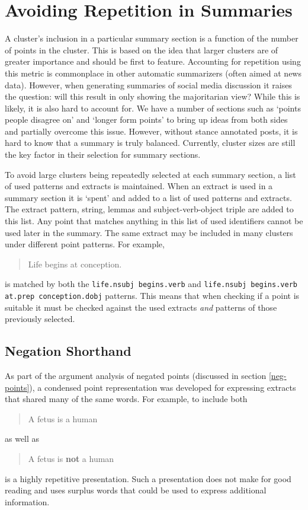   \section{Avoiding Repetition in Summaries}
    A cluster's inclusion in a particular summary section is a function of the number of points in the cluster. This is based on the idea that larger clusters are of greater importance and should be first to feature. Accounting for repetition using this metric is commonplace in other automatic summarizers (often aimed at news data). However, when generating summaries of social media discussion it raises the question: will this result in only showing the majoritarian view? While this is likely, it is also hard to account for. We have a number of sections such as `points people disagree on' and `longer form points' to bring up ideas from both sides and partially overcome this issue. However, without stance annotated posts, it is hard to know that a summary is truly balanced. Currently, cluster sizes are still the key factor in their selection for summary sections.

    To avoid large clusters being repeatedly selected at each summary section, a list of used patterns and extracts is maintained. When an extract is used in a summary section it is `spent' and added to a list of used patterns and extracts. The extract pattern, string, lemmas and subject-verb-object triple are added to this list. Any point that matches anything in this list of used identifiers cannot be used later in the summary. The same extract may be included in many clusters under different point patterns. For example, \blockquote{Life begins at conception.} is matched by both the \texttt{life.nsubj begins.verb} and \texttt{life.nsubj begins.verb at.prep conception.dobj} patterns. This means that when checking if a point is suitable it must be checked against the used extracts \textit{and} patterns of those previously selected.

    \tocless\subsection{Negation Shorthand}
      As part of the argument analysis of negated points (discussed in section \ref{neg-points}), a condensed point representation was developed for expressing extracts that shared many of the same words. For example, to include both \blockquote{A fetus is a human} as well as \blockquote{A fetus is \textbf{not} a human} is a highly repetitive presentation. Such a presentation does not make for good reading and uses surplus words that could be used to express additional information.

